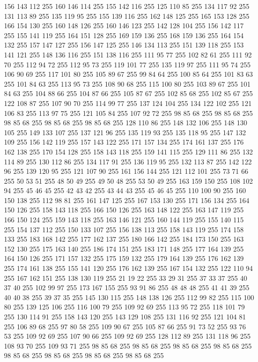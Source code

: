 156 143 112 255 160 146 114 255 155 142 116 255 125 110 85 255 134 117 92 255 131 113 89 255 135 119 95 255 155 139 116 255 162 148 125 255 165 153 128 255 166 154 130 255 160 148 126 255 160 146 123 255 142 128 104 255 156 142 117 255 155 141 119 255 164 151 128 255 169 159 136 255 168 159 136 255 164 154 132 255 157 147 127 255 156 147 125 255 146 134 113 255 151 139 118 255 153 141 121 255 148 136 116 255 151 138 116 255 111 95 77 255 102 82 61 255 111 92 70 255 112 94 72 255 112 95 73 255 119 101 77 255 135 119 97 255 111 95 74 255 106 90 69 255 117 101 80 255 105 89 67 255 99 84 64 255 100 85 64 255 101 83 63 255 101 84 63 255 113 95 73 255 108 90 68 255 115 100 80 255 103 89 67 255 101 84 63 255 104 88 66 255 104 87 66 255 105 87 67 255 102 85 68 255 102 85 67 255 122 108 87 255 107 90 70 255 114 99 77 255 137 124 104 255 134 122 102 255 121 106 83 255 113 97 75 255 121 105 84 255 107 92 72 255 98 85 68 255 98 85 68 255 98 85 68 255
98 85 68 255 98 85 68 255 128 110 86 255 148 132 106 255 148 130 105 255 149 133 107 255 137 121 96 255 135 119 93 255 135 118 95 255 147 132 109 255 156 142 119 255 157 143 122 255 171 157 134 255 174 161 137 255 176 162 138 255 170 154 128 255 158 143 118 255 159 141 115 255 129 111 86 255 132 114 89 255 130 112 86 255 134 117 91 255 136 119 95 255 132 113 87 255 142 122 96 255 139 120 95 255 121 107 90 255 161 156 144 255 121 112 101 255 73 71 66 255 50 53 51 255 48 50 49 255 49 50 48 255 53 50 49 255 163 159 150 255 108 102 94 255 45 46 45 255 42 43 42 255 43 44 43 255 45 46 45 255 110 100 90 255 160 150 138 255 112 98 81 255 161 147 125 255 167 153 130 255 171 156 134 255 164 150 126 255 158 143 118 255 166 150 126 255 163 148 122 255 163 147 119 255 166 150 124 255 159 143 118 255 163 146 121 255 160 144 119 255 155 140 115 255 154 137 112 255 150 133 107 255 156 138 113 255 158 143 119 255 174 158 133 255 183 168 142 255 177 162 137 255 180 166 142 255
184 173 150 255 163 152 130 255 175 163 140 255 186 174 151 255 183 171 148 255 177 164 139 255 164 150 126 255 171 157 132 255 175 159 132 255 179 164 139 255 176 162 139 255 174 161 138 255 155 141 120 255 176 162 139 255 167 154 132 255 122 110 94 255 167 162 151 255 138 130 119 255 21 19 22 255 33 29 31 255 37 33 37 255 40 37 40 255 102 99 97 255 173 167 155 255 93 91 86 255 48 48 48 255 41 41 39 255 40 40 38 255 39 37 35 255 145 130 115 255 148 138 126 255 112 99 82 255 115 100 80 255 139 125 106 255 116 100 79 255 109 92 69 255 113 95 72 255 118 101 79 255 130 114 91 255 158 143 120 255 143 129 108 255 131 116 92 255 121 104 81 255 106 89 68 255 97 80 58 255 109 90 67 255 105 87 66 255 91 73 52 255 93 76 53 255 109 92 69 255 107 90 66 255 109 92 69 255 128 112 89 255 131 118 96 255 108 93 70 255 109 93 71 255 98 85 68 255 98 85 68 255 98 85 68 255 98 85 68 255 98 85 68 255 98 85 68 255 98 85 68 255 98 85 68 255
